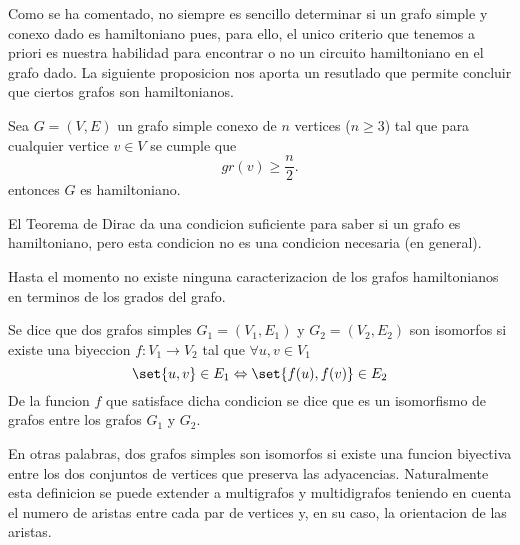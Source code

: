 Como se ha comentado, no siempre es sencillo determinar si un grafo simple y conexo dado es hamiltoniano pues, para ello, el unico criterio que tenemos a priori es nuestra habilidad para encontrar o no un circuito hamiltoniano en el grafo dado. La siguiente proposicion nos aporta un resutlado que permite concluir que ciertos grafos son hamiltonianos.

\begin{theorem}[de Dirac]
	Sea \(G = (V,E )\) un grafo simple conexo de \(n \) vertices (\(n \geq 3 \)) tal que para cualquier vertice \(v \in V \) se cumple que
	\[
		gr(v) \geq \frac{n }{2 }.
	\]
	entonces \(G \) es hamiltoniano.
\end{theorem}

El Teorema de Dirac da una condicion suficiente para saber si un grafo es hamiltoniano, pero esta condicion no es una condicion necesaria (en general).

Hasta el momento no existe ninguna caracterizacion de los grafos hamiltonianos en terminos de los grados del grafo.

\begin{definition}
	Se dice que dos grafos simples \(G_1 = (V_1,E_1 )\) y \(G_2 = (V_2,E_2 )\) son isomorfos si existe una biyeccion \(f \colon V_1 \to V_2 \) tal que \(\forall u,v \in V_1 \)
	\[
		\set{u,v} \in E_1 \iff \set{f(u),f(v)} \in E_2
	\]
	De la funcion \(f \) que satisface dicha condicion se dice que es un isomorfismo de grafos entre los grafos \(G_1 \) y \(G_2 \).
\end{definition}
En otras palabras, dos grafos simples son isomorfos si existe una funcion biyectiva entre los dos conjuntos de vertices que preserva las adyacencias. Naturalmente esta definicion se puede extender a multigrafos y multidigrafos teniendo en cuenta el numero de aristas entre cada par de vertices y, en su caso, la orientacion de las aristas. 

